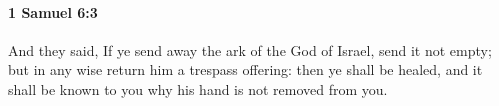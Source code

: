 
		\paragraph{1 Samuel 6:3} %
			\label{1SAMUEL-6-3}

			And they said, If ye send away the ark of the God of Israel, send it not empty; but in any wise return him a trespass offering: then ye shall be healed, and it shall be known to you why his hand is not removed from you.


